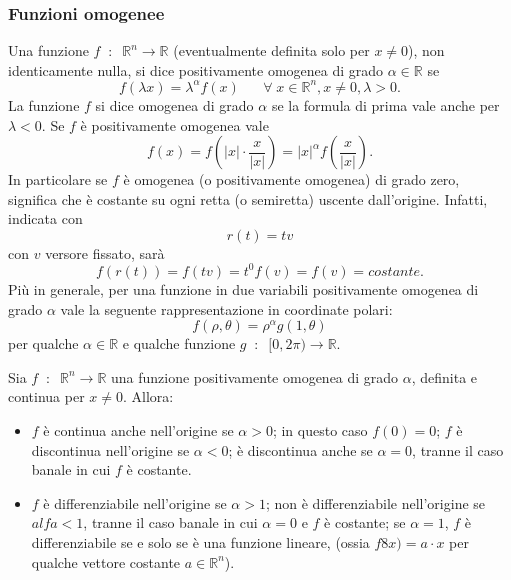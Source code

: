 \subsubsection*{Funzioni omogenee}
Una funzione $f \;\;:\;\; \mathbb{R}^n \rightarrow \mathbb{R}$ (eventualmente definita solo per $x\neq 0$), non identicamente nulla, si dice positivamente omogenea di grado $\alpha \in \mathbb{R}$ se
\[
    f(\lambda x) = \lambda^\alpha f(x) \;\;\;\;\; \;\forall\;x \in \mathbb{R}^n, x\neq 0, \lambda>0.
\]
La funzione $f$ si dice omogenea di grado $\alpha$ se la formula di prima vale anche per $\lambda<0$.\newline
Se $f$ è positivamente omogenea vale
\[
    f(x) = f( |x| \cdot \frac{x}{|x|}) = |x|^\alpha f(\frac{x}{|x|}).
\]
In particolare se $f$ è omogenea (o positivamente omogenea) di grado zero, significa che è costante su ogni retta (o semiretta) uscente dall'origine. Infatti, indicata con
\[
    r(t)=tv
\]
con $v$ versore fissato, sarà
\[
    f(r(t))=f(tv)=t^0f(v)=f(v)=costante.
\]
Più in generale, per una funzione in due variabili positivamente omogenea di grado $\alpha$ vale la seguente rappresentazione in coordinate polari:
\[
    f(\rho, \theta)=\rho^\alpha g(1,\theta)
\]
per qualche $\alpha \in \mathbb{R}$ e qualche funzione $g \;\;:\;\; [0, 2\pi) \rightarrow \mathbb{R}$.\newline

Sia $f \;\;:\;\; \mathbb{R}^n \rightarrow \mathbb{R}$ una funzione positivamente omogenea di grado $\alpha$, definita e continua per $x\neq 0$. Allora:
\begin{itemize}
    \item $f$ è continua anche nell'origine se $\alpha>0$; in questo caso $f(0) = 0$; $f$ è discontinua nell'origine se $\alpha<0$; è discontinua anche se $\alpha=0$, tranne il caso banale in cui $f$ è costante.
    \item $f$ è differenziabile nell'origine se $\alpha>1$; non è differenziabile nell'origine se $alfa <1$, tranne il caso banale in cui $\alpha=0$ e $f$ è costante; se $\alpha=1$, $f$ è differenziabile se e solo se è una funzione lineare, (ossia $f8x) = a \cdot x$ per qualche vettore costante $a \in \mathbb{R}^n$).
\end{itemize}
